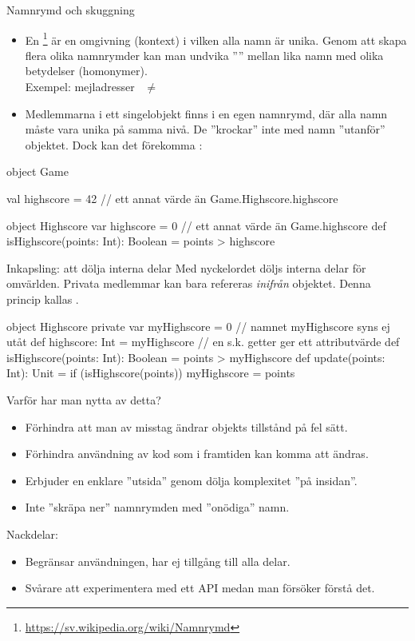 \begin{Slide}{Namnrymd och skuggning}
\begin{itemize}\SlideFontSmall
  \item En \footnote{\url{https://sv.wikipedia.org/wiki/Namnrymd}}   är en omgivning (kontext) i vilken alla namn är unika. Genom att skapa flera olika namnrymder
  kan man undvika '''' mellan lika namn med olika betydelser (homonymer). \\
  Exempel: mejladresser   ~$\neq$~  
  \item Medlemmarna i ett singelobjekt finns i en egen namnrymd,
  där alla namn måste vara unika på samma nivå. De ''krockar'' inte med namn ''utanför'' objektet. Dock kan det förekomma  :
\end{itemize}
\begin{Code}
object Game {

  val highscore = 42   // ett annat värde än Game.Highscore.highscore

  object Highscore {
    var highscore = 0  // ett annat värde än Game.highscore
    def isHighscore(points: Int): Boolean = points > highscore
  }
}
\end{Code}

\end{Slide}



\begin{Slide}{Inkapsling: att dölja interna delar}\SlideFontSmall
Med nyckelordet  döljs interna delar för omvärlden.
Privata medlemmar kan bara refereras \emph{inifrån} objektet.
Denna princip kallas  .
\begin{CodeSmall}
object Highscore {
  private var myHighscore = 0        // namnet myHighscore syns ej utåt
  def highscore: Int = myHighscore   // en s.k. getter ger ett attributvärde
  def isHighscore(points: Int): Boolean = points > myHighscore
  def update(points: Int): Unit = if (isHighscore(points)) myHighscore = points
}
\end{CodeSmall}
\pause
Varför har man nytta av detta?
\begin{itemize}
  \item Förhindra att man av misstag ändrar objekts tillstånd på fel sätt.
  \item Förhindra användning av kod som i framtiden kan komma att ändras.
  \item Erbjuder en enklare ''utsida'' genom dölja komplexitet ''på insidan''.
  \item Inte ''skräpa ner'' namnrymden med ''onödiga'' namn.
\end{itemize}
Nackdelar:
\begin{itemize}
  \item Begränsar användningen, har ej tillgång till alla delar.
  \item Svårare att experimentera med ett API medan man försöker förstå det.
\end{itemize}
\end{Slide}



